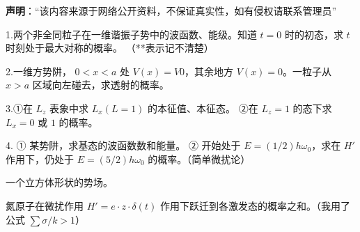 
\textbf{声明}：“该内容来源于网络公开资料，不保证真实性，如有侵权请联系管理员”


1.两个非全同粒子在一维谐振子势中的波函数、能级。知道 $t = 0$ 时的初态，求 $t$ 时刻处于最大对称的概率。 （**表示记不清楚）

2.一维方势阱， $0 < x < a$ 处 $V(x) = V0$，其余地方 $V(x) = 0$。一粒子从 $x > a$ 区域向左碰去，求透射的概率。


3.①在 $L_z$ 表象中求 $L_x (L = 1)$ 的本征值、本征态。
②在 $L_z = 1$ 的态下求 $L_x = 0$ 或 $1$ 的概率。

4. ① 某势阱，求基态的波函数数和能量。 ② 开始处于 $E = (1/2) h \omega_0$，求在 $H'$ 作用下，仍处于 $E = (5/2) h \omega_0$ 的概率。（简单微扰论）
    \item 一个立方体形状的势场。
    \item 氮原子在微扰作用 $H' = e \cdot z \cdot \delta(t)$ 作用下跃迁到各激发态的概率之和。（我用了公式 $\sum \sigma /k > 1$）

